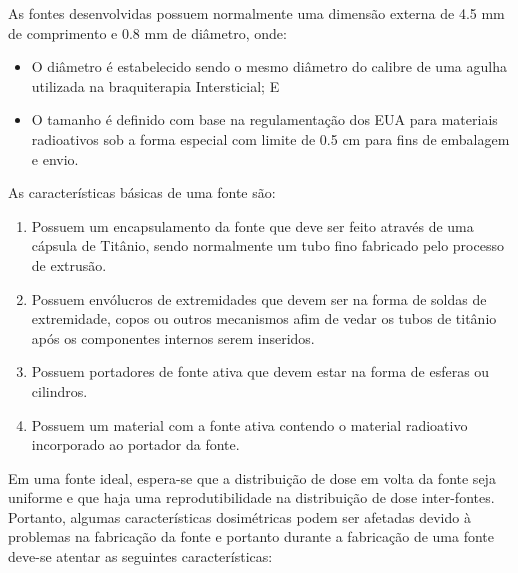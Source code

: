 \documentclass[11pt,a4paper]{article}
\begin{document}
			As fontes desenvolvidas possuem normalmente uma dimensão externa de 4.5 mm de comprimento e 0.8 mm de diâmetro, onde:

				\begin{itemize}
					\item O diâmetro é estabelecido sendo o mesmo diâmetro do calibre de uma agulha utilizada na braquiterapia Intersticial; E
					\item O tamanho é definido com base na regulamentação dos EUA para materiais radioativos sob a forma especial com limite de 0.5 cm para fins de embalagem e envio.
				\end{itemize}

				As características básicas de uma fonte são:

				\begin{enumerate}[label=\textcolor{CarnationPink}{(\roman*)}]
					\item Possuem um encapsulamento da fonte que deve ser feito através de uma cápsula de Titânio, sendo normalmente um tubo fino fabricado pelo processo de extrusão.
					\item Possuem envólucros de extremidades que devem ser na forma de soldas de extremidade, copos ou outros mecanismos afim de vedar os tubos de titânio após os componentes internos serem inseridos.
					\item Possuem portadores de fonte ativa que devem estar na forma de esferas ou cilindros.
					\item Possuem um material com a fonte ativa contendo o material radioativo incorporado ao portador da fonte.
				\end{enumerate}


			Em uma fonte ideal, espera-se que a distribuição de dose em volta da fonte seja uniforme e que haja uma reprodutibilidade na distribuição de dose inter-fontes. Portanto, algumas características dosimétricas podem ser afetadas devido à problemas na fabricação da fonte e portanto durante a fabricação de uma fonte deve-se atentar as seguintes características:
\end{document}

